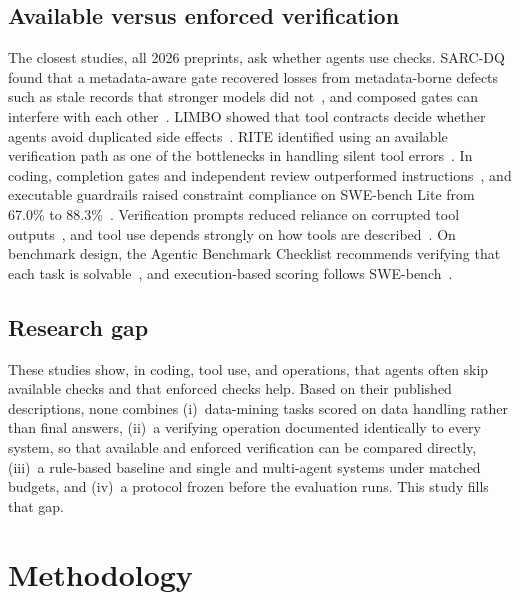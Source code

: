 \documentclass[conference]{IEEEtran}
\begin{document}
\subsection{Available versus enforced verification}
The closest studies, all 2026 preprints, ask whether agents use checks. SARC-DQ found that a metadata-aware gate recovered
losses from metadata-borne defects such as stale records that stronger models did not~\cite{besanson2026sarcdq}, and composed gates can
interfere with each other~\cite{besanson2026onegate}. LIMBO showed that tool contracts decide whether agents avoid
duplicated side effects~\cite{li2026limbo}. RITE identified using an available verification path as one of the
bottlenecks in handling silent tool errors~\cite{zhang2026rite}. In coding, completion gates and independent review
outperformed instructions~\cite{zhang2026rethinking}, and executable guardrails raised constraint compliance on
SWE-bench Lite from 67.0\% to 88.3\%~\cite{sharma2026contextcov}. Verification prompts reduced reliance on corrupted
tool outputs~\cite{yang2026overreliance}, and tool use depends strongly on how tools are
described~\cite{faghih2025toolprefs}. On benchmark design, the Agentic Benchmark Checklist recommends verifying that
each task is solvable~\cite{zhu2025abc}, and execution-based scoring follows SWE-bench~\cite{jimenez2024swebench}.

\subsection{Research gap}
These studies show, in coding, tool use, and operations, that agents often skip available checks and that enforced
checks help. Based on their published descriptions, none combines (i)~data-mining tasks scored on data handling
rather than final answers, (ii)~a verifying operation documented identically to every system, so that available and
enforced verification can be compared directly, (iii)~a rule-based baseline and single and multi-agent systems under
matched budgets, and (iv)~a protocol frozen before the evaluation runs. This study fills that gap.

\section{Methodology}
\label{sec:method}
\end{document}
